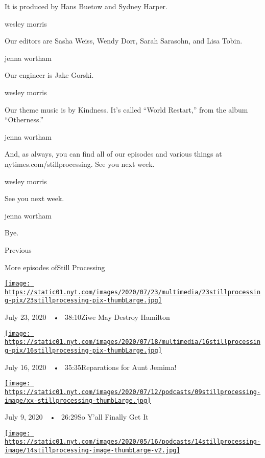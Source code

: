 It is produced by Hans Buetow and Sydney Harper.

wesley morris

Our editors are Sasha Weiss, Wendy Dorr, Sarah Sarasohn, and Lisa Tobin.

jenna wortham

Our engineer is Jake Gorski.

wesley morris

Our theme music is by Kindness. It's called ``World Restart,'' from the
album ``Otherness.''

jenna wortham

And, as always, you can find all of our episodes and various things at
nytimes.com/stillprocessing. See you next week.

wesley morris

See you next week.

jenna wortham

Bye.

Previous

More episodes ofStill Processing

\href{https://www.nytimes.com/2020/07/23/podcasts/hamilton-ziwe-discomfort.html?action=click\&module=audio-series-bar\&region=header\&pgtype=Article}{\texttt{[image: https://static01.nyt.com/images/2020/07/23/multimedia/23stillprocessing-pix/23stillprocessing-pix-thumbLarge.jpg]}}

July 23, 2020~~•~ 38:10Ziwe May Destroy Hamilton

\href{https://www.nytimes.com/2020/07/16/podcasts/reparations-for-aunt-jemima.html?action=click\&module=audio-series-bar\&region=header\&pgtype=Article}{\texttt{[image: https://static01.nyt.com/images/2020/07/18/multimedia/16stillprocessing-pix/16stillprocessing-pix-thumbLarge.jpg]}}

July 16, 2020~~•~ 35:35Reparations for Aunt Jemima!

\href{https://www.nytimes.com/2020/07/09/podcasts/still-processing-black-lives-matter.html?action=click\&module=audio-series-bar\&region=header\&pgtype=Article}{\texttt{[image: https://static01.nyt.com/images/2020/07/12/podcasts/09stillprocessing-image/xx-stillprocessing-thumbLarge.jpg]}}

July 9, 2020~~•~ 26:29So Y'all Finally Get It

\href{https://www.nytimes.com/2020/05/14/podcasts/still-processing-westworld-hollywood-utopia-dystopia.html?action=click\&module=audio-series-bar\&region=header\&pgtype=Article}{\texttt{[image: https://static01.nyt.com/images/2020/05/16/podcasts/14stillprocessing-image/14stillprocessing-image-thumbLarge-v2.jpg]}}

